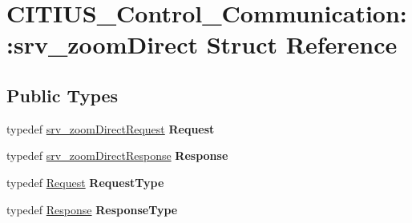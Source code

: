 \hypertarget{struct_c_i_t_i_u_s___control___communication_1_1srv__zoom_direct}{\section{\-C\-I\-T\-I\-U\-S\-\_\-\-Control\-\_\-\-Communication\-:\-:srv\-\_\-zoom\-Direct \-Struct \-Reference}
\label{struct_c_i_t_i_u_s___control___communication_1_1srv__zoom_direct}
}
\subsection*{\-Public \-Types}
\begin{DoxyCompactItemize}
\item 
\hypertarget{struct_c_i_t_i_u_s___control___communication_1_1srv__zoom_direct_ac618e20cd12fe5a46b825dbd0e1c294b}{typedef \hyperlink{struct_c_i_t_i_u_s___control___communication_1_1srv__zoom_direct_request__}{srv\-\_\-zoom\-Direct\-Request} {\bfseries \-Request}}\label{struct_c_i_t_i_u_s___control___communication_1_1srv__zoom_direct_ac618e20cd12fe5a46b825dbd0e1c294b}

\item 
\hypertarget{struct_c_i_t_i_u_s___control___communication_1_1srv__zoom_direct_a503ea79cbfdd6984a54177c869dd6d28}{typedef \hyperlink{struct_c_i_t_i_u_s___control___communication_1_1srv__zoom_direct_response__}{srv\-\_\-zoom\-Direct\-Response} {\bfseries \-Response}}\label{struct_c_i_t_i_u_s___control___communication_1_1srv__zoom_direct_a503ea79cbfdd6984a54177c869dd6d28}

\item 
\hypertarget{struct_c_i_t_i_u_s___control___communication_1_1srv__zoom_direct_a6c31a8ff405c6eb20a633c262623c868}{typedef \hyperlink{struct_c_i_t_i_u_s___control___communication_1_1srv__zoom_direct_request__}{\-Request} {\bfseries \-Request\-Type}}\label{struct_c_i_t_i_u_s___control___communication_1_1srv__zoom_direct_a6c31a8ff405c6eb20a633c262623c868}

\item 
\hypertarget{struct_c_i_t_i_u_s___control___communication_1_1srv__zoom_direct_a6bff1e325d3573c309658acafcad794b}{typedef \hyperlink{struct_c_i_t_i_u_s___control___communication_1_1srv__zoom_direct_response__}{\-Response} {\bfseries \-Response\-Type}}\label{struct_c_i_t_i_u_s___control___communication_1_1srv__zoom_direct_a6bff1e325d3573c309658acafcad794b}

\end{DoxyCompactItemize}
